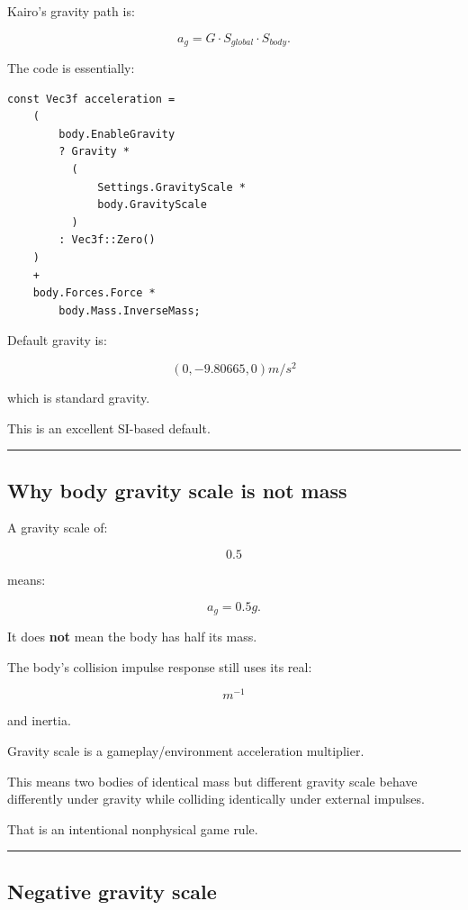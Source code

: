 Kairo's gravity path is:

\[
\boxed{
a_g
=
G
\cdot
S_{global}
\cdot
S_{body}.
}
\]

The code is essentially:

\begin{verbatim}
const Vec3f acceleration =
    (
        body.EnableGravity
        ? Gravity *
          (
              Settings.GravityScale *
              body.GravityScale
          )
        : Vec3f::Zero()
    )
    +
    body.Forces.Force *
        body.Mass.InverseMass;
\end{verbatim}

Default gravity is:

\[
\boxed{
(0,-9.80665,0)m/s^2
}
\]

which is standard gravity.

This is an excellent SI-based default.

\begin{center}\rule{0.5\linewidth}{0.5pt}\end{center}

\subsection{Why body gravity scale is not mass}\label{06-engine-ii-ch038-why-body-gravity-scale-is-not-mass}

A gravity scale of:

\[
0.5
\]

means:

\[
a_g=
0.5g.
\]

It does \textbf{not} mean the body has half its mass.

The body's collision impulse response still uses its real:

\[
m^{-1}
\]

and inertia.

Gravity scale is a gameplay/environment acceleration multiplier.

This means two bodies of identical mass but different gravity scale behave differently under gravity while colliding identically under external impulses.

That is an intentional nonphysical game rule.

\begin{center}\rule{0.5\linewidth}{0.5pt}\end{center}

\subsection{Negative gravity scale}\label{06-engine-ii-ch038-negative-gravity-scale}

